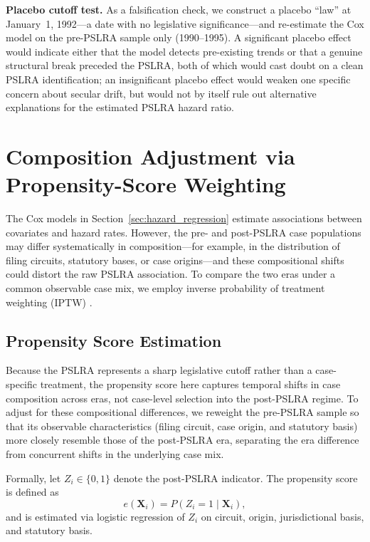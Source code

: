 \textbf{Placebo cutoff test.} As a falsification check, we
construct a placebo ``law'' at January~1, 1992---a date with
no legislative significance---and re-estimate the Cox model
on the pre-PSLRA sample only (1990--1995). A significant placebo effect would indicate either that the model detects pre-existing trends or that a genuine structural break preceded the PSLRA, both of which would cast doubt on a clean PSLRA identification; an insignificant placebo effect would weaken
one specific concern about secular drift, but would not by
itself rule out alternative explanations for the estimated PSLRA hazard ratio.

\section{Composition Adjustment via Propensity-Score Weighting}
\label{sec:iptw}

The Cox models in Section~\ref{sec:hazard_regression} estimate associations between
covariates and hazard rates. However, the pre- and post-PSLRA
case populations may differ systematically in composition---for
example, in the distribution of filing circuits, statutory
bases, or case origins---and these compositional shifts could
distort the raw PSLRA association. To compare the two eras
under a common observable case mix,
we employ inverse probability of treatment weighting
(IPTW) \citep{xieliu2005, austinfine2025}.

\subsection{Propensity Score Estimation}

Because the PSLRA represents a sharp legislative cutoff rather than a
case-specific treatment, the propensity score here captures temporal shifts
in case composition across eras, not case-level selection into the
post-PSLRA regime. To adjust for these compositional differences, we
reweight the pre-PSLRA sample so that its observable characteristics
(filing circuit, case origin, and statutory basis) more closely resemble
those of the post-PSLRA era, separating the era difference from concurrent
shifts in the underlying case mix.

Formally, let $Z_i \in \{0,1\}$ denote the post-PSLRA indicator. The
propensity score is defined as
\begin{equation}
e(\mathbf{X}_i) = P(Z_i = 1 \mid \mathbf{X}_i),
\end{equation}
and is estimated via logistic regression of $Z_i$ on circuit, origin,
jurisdictional basis, and statutory basis.

